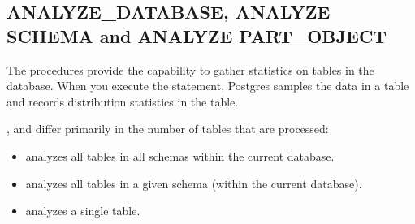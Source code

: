\documentclass[letterpaper,10pt,english,openany,oneside]{sphinxmanual}
\begin{document}
\newpage


\subsection{ANALYZE\_DATABASE, ANALYZE SCHEMA and ANALYZE PART\_OBJECT}
\label{\detokenize{dbms_utility:analyze-database-analyze-schema-and-analyze-part-object}}
The 
procedures provide the capability to gather statistics on tables in the
database. When you execute the  statement, Postgres samples the
data in a table and records distribution statistics in the
 table.

, and  differ
primarily in the number of tables that are processed:
\begin{itemize}
\item {} 
 analyzes all tables in all schemas within the current database.

\item {} 
 analyzes all tables in a given schema (within the current database).

\item {} 
 analyzes a single table.

\end{itemize}
\end{document}
